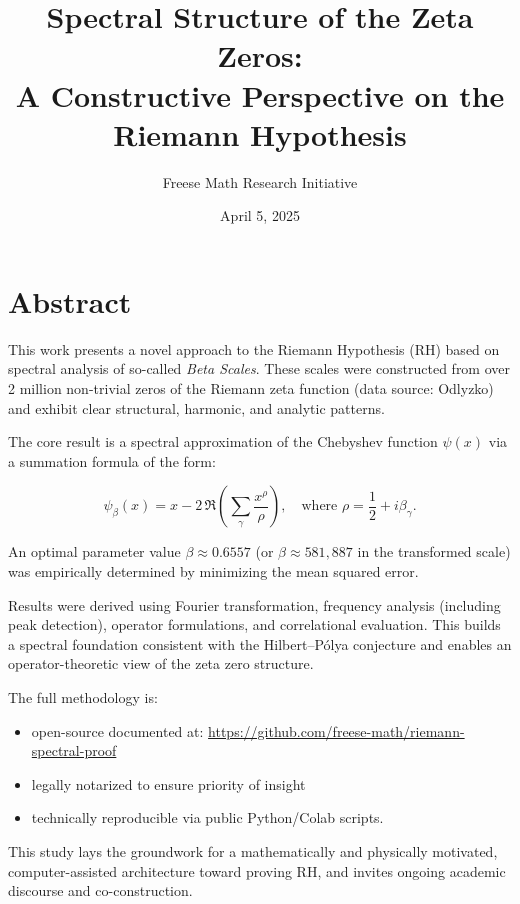 \documentclass[12pt]{article}
\title{\textbf{Spectral Structure of the Zeta Zeros:}\\ A Constructive Perspective on the Riemann Hypothesis}
\author{Freese Math Research Initiative}
\date{April 5, 2025}
\begin{document}
\maketitle

\section*{Abstract}

This work presents a novel approach to the Riemann Hypothesis (RH) based on spectral analysis of so-called \emph{Beta Scales}. These scales were constructed from over 2 million non-trivial zeros of the Riemann zeta function (data source: Odlyzko) and exhibit clear structural, harmonic, and analytic patterns.

The core result is a spectral approximation of the Chebyshev function $\psi(x)$ via a summation formula of the form:

\[
\psi_\beta(x) = x - 2 \, \Re \left( \sum_{\gamma} \frac{x^{\rho}}{\rho} \right), \quad \text{where } \rho = \frac{1}{2} + i\beta_\gamma.
\]

An optimal parameter value $\beta \approx 0.6557$ (or $\beta \approx 581{,}887$ in the transformed scale) was empirically determined by minimizing the mean squared error.

Results were derived using Fourier transformation, frequency analysis (including peak detection), operator formulations, and correlational evaluation. This builds a spectral foundation consistent with the Hilbert–Pólya conjecture and enables an operator-theoretic view of the zeta zero structure.

The full methodology is:

\begin{itemize}
    \item open-source documented at: \url{https://github.com/freese-math/riemann-spectral-proof}
    \item legally notarized to ensure priority of insight
    \item technically reproducible via public Python/Colab scripts.
\end{itemize}

This study lays the groundwork for a mathematically and physically motivated, computer-assisted architecture toward proving RH, and invites ongoing academic discourse and co-construction.
\end{document}
